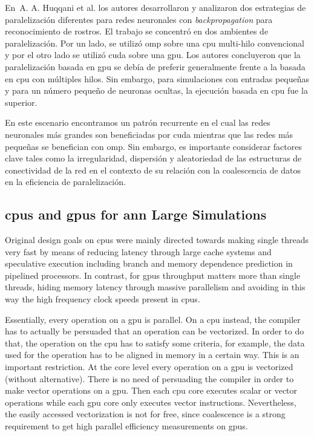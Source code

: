 {En~A. A. Huqqani et al. \cite{HUQQANI2013349} los autores desarrollaron y analizaron dos estrategias de paralelización diferentes para redes neuronales con \emph{backpropagation} para reconocimiento de rostros.
El trabajo se concentró en dos ambientes de paralelización.
Por un lado, se utilizó \gls{omp} sobre una \gls{cpu} multi-hilo convencional y por el otro lado se utilizó \gls{cuda} sobre una \gls{gpu}.
Los autores concluyeron que la paralelización basada en \gls{gpu} se debía de preferir generalmente frente a la basada en \gls{cpu} con múltiples hilos.
Sin embargo, para simulaciones con entradas pequeñas y para un número pequeño de neuronas ocultas, la ejecución basada en \gls{cpu} fue la superior.

En este escenario encontramos un patrón recurrente en el cual las redes neuronales más grandes son beneficiadas por \gls{cuda} mientras que las redes más pequeñas se benefician con \gls{omp}.
Sin embargo, es importante considerar factores clave tales como la irregularidad, dispersión y aleatoriedad de las estructuras de conectividad de la red en el contexto de su relación con la coalescencia de datos en la eficiencia de paralelización.
}{
\subsection{\glspl{cpu} and \glspl{gpu} for \gls{ann} Large Simulations}

Original design goals on \glspl{cpu} were mainly directed towards making single threads very fast by means of reducing latency through large cache systems and speculative execution including branch and memory dependence prediction in pipelined processors. In contrast, for \glspl{gpu} throughput matters more than single threads, hiding memory latency through massive parallelism and avoiding in this way the high frequency clock speeds present in \glspl{cpu}.

Essentially, every operation on a \gls{gpu} is parallel. On a \gls{cpu} instead, the compiler has to actually be persuaded that an operation can be vectorized. In order to do that, the operation on the \gls{cpu} has to satisfy some criteria, for example, the data used for the operation has to be aligned in memory in a certain way. This is an important restriction. At the core level every operation on a \gls{gpu} is vectorized (without alternative). There is no need of persuading the compiler in order to make vector operations on a \gls{gpu}. Then each \gls{cpu} core executes scalar or vector operations while each \gls{gpu} core only executes vector instructions. Nevertheless, the easily accessed vectorization is not for free, since coalescence is a strong requirement to get high parallel efficiency measurements on \glspl{gpu}.

}
